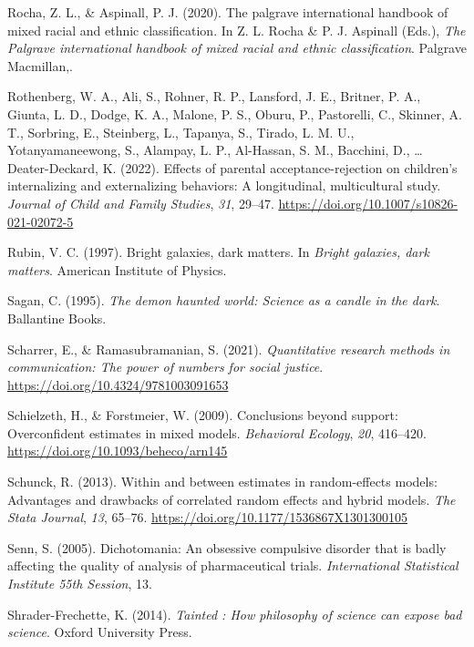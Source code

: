 \documentclass[
  letterpaper,
  DIV=11,
  numbers=noendperiod]{scrreprt}
\newlength{\cslhangindent}
\newenvironment{CSLReferences}[2] %
 {\begin{list}{}{%
  \setlength{\itemindent}{0pt}
  \setlength{\leftmargin}{0pt}
  \setlength{\parsep}{0pt}
  \ifodd #1
   \setlength{\leftmargin}{\cslhangindent}
   \setlength{\itemindent}{-1\cslhangindent}
  \fi
  \setlength{\itemsep}{#2\baselineskip}}}
 {\end{list}}
\begin{document}
\begin{CSLReferences}{1}{0}
Rocha, Z. L., \& Aspinall, P. J. (2020). The palgrave international
handbook of mixed racial and ethnic classification. In Z. L. Rocha \& P.
J. Aspinall (Eds.), \emph{The Palgrave international handbook of mixed
racial and ethnic classification}. Palgrave Macmillan,.

Rothenberg, W. A., Ali, S., Rohner, R. P., Lansford, J. E., Britner, P.
A., Giunta, L. D., Dodge, K. A., Malone, P. S., Oburu, P., Pastorelli,
C., Skinner, A. T., Sorbring, E., Steinberg, L., Tapanya, S., Tirado, L.
M. U., Yotanyamaneewong, S., Alampay, L. P., Al-Hassan, S. M., Bacchini,
D., \ldots{} Deater-Deckard, K. (2022). Effects of parental
acceptance-rejection on children's internalizing and externalizing
behaviors: A longitudinal, multicultural study. \emph{Journal of Child
and Family Studies}, \emph{31}, 29--47.
\url{https://doi.org/10.1007/s10826-021-02072-5}

Rubin, V. C. (1997). Bright galaxies, dark matters. In \emph{Bright
galaxies, dark matters}. American Institute of Physics.

Sagan, C. (1995). \emph{The demon haunted world: Science as a candle in
the dark}. Ballantine Books.

Scharrer, E., \& Ramasubramanian, S. (2021). \emph{Quantitative research
methods in communication: The power of numbers for social justice}.
\url{https://doi.org/10.4324/9781003091653}

Schielzeth, H., \& Forstmeier, W. (2009). Conclusions beyond support:
Overconfident estimates in mixed models. \emph{Behavioral Ecology},
\emph{20}, 416--420. \url{https://doi.org/10.1093/beheco/arn145}

Schunck, R. (2013). Within and between estimates in random-effects
models: Advantages and drawbacks of correlated random effects and hybrid
models. \emph{The Stata Journal}, \emph{13}, 65--76.
\url{https://doi.org/10.1177/1536867X1301300105}

Senn, S. (2005). Dichotomania: An obsessive compulsive disorder that is
badly affecting the quality of analysis of pharmaceutical trials.
\emph{International Statistical Institute 55th Session}, 13.

Shrader-Frechette, K. (2014). \emph{Tainted : How philosophy of science
can expose bad science}. Oxford University Press.


\end{CSLReferences}
\end{document}
